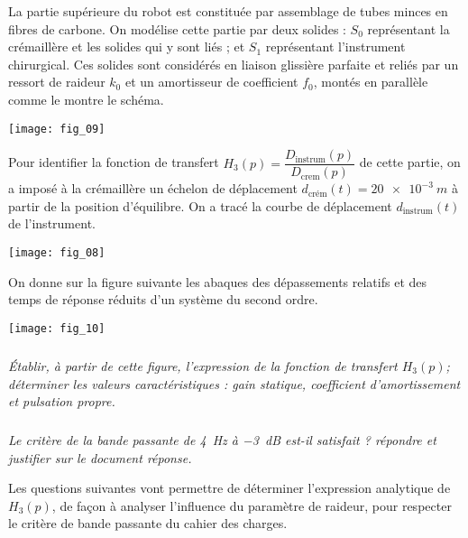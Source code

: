 \begin{multicols}{2}
La partie supérieure du robot est constituée par assemblage de tubes minces en fibres de carbone. 
On modélise cette partie par deux solides : $S_0$ représentant la crémaillère et les solides qui y sont liés ;  et $S_1$ représentant l’instrument chirurgical. 
Ces solides sont considérés en liaison glissière parfaite et reliés par un ressort de raideur $k_0$ et un amortisseur de coefficient $f_0$, montés en parallèle comme le montre le schéma.

\begin{center}
\texttt{[image: fig\_09]}
\end{center}

Pour identifier la fonction de transfert $H_3(p)=\dfrac{D_{\text{instrum}}(p)}{D_{\text{crem}}(p)}$ de cette partie, on a imposé à la crémaillère un échelon de déplacement $d_{\text{crém}}(t) = \SI{20e-3}{m}$ à partir de la position d’équilibre. On a tracé la courbe de déplacement $d_{\text{instrum}}(t)$ de l’instrument.

\begin{center}
\texttt{[image: fig\_08]}
\end{center}

On donne sur la figure suivante les abaques des dépassements relatifs et des temps de réponse réduits d’un système du second ordre.

\begin{center}
\texttt{[image: fig\_10]}
\end{center}


\subparagraph{}\textit{Établir, à partir de cette figure, l’expression de la fonction de transfert $H_3(p)$; déterminer les valeurs caractéristiques : gain statique, coefficient d’amortissement et pulsation propre.}
\ifprof
\begin{corrige}
\end{corrige}
\else
\fi


\subparagraph{}\textit{Le critère de la bande passante de \SI{4}{Hz} à  \SI{-3}{dB} est-il satisfait ? répondre et justifier sur le document réponse.}
\ifprof
\begin{corrige}
\end{corrige}
\else
\fi



Les questions suivantes vont permettre de déterminer l’expression analytique de $H_3(p)$, de façon à analyser l’influence du paramètre de raideur, pour respecter le critère de bande passante du cahier des charges.


\end{multicols}
